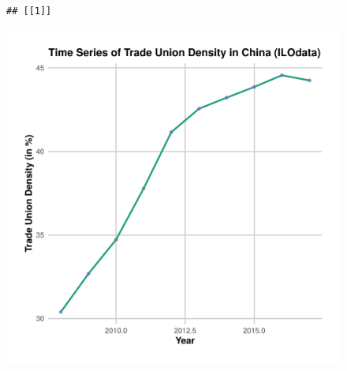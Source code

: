 \documentclass[11pt]{article}\usepackage[]{graphicx}\usepackage[]{xcolor}
\makeatletter
\newenvironment{kframe}{%
 \def\at@end@of@kframe{}%
 \ifinner\ifhmode%
  \def\at@end@of@kframe{\end{minipage}}%
  \begin{minipage}{\columnwidth}%
 \fi\fi%
 \def\FrameCommand##1{\hskip\@totalleftmargin \hskip-\fboxsep
 \colorbox{shadecolor}{##1}\hskip-\fboxsep
     \hskip-\linewidth \hskip-\@totalleftmargin \hskip\columnwidth}%
 \MakeFramed {\advance\hsize-\width
   \@totalleftmargin\z@ \linewidth\hsize
   \@setminipage}}%
 {\par\unskip\endMakeFramed%
 \at@end@of@kframe}
\newenvironment{knitrout}{}{} %
\makeatother
\begin{document}
\begin{figure}[h]
\centering
  \begin{minipage}{0.7\linewidth}
\begin{knitrout}
\color{fgcolor}\begin{kframe}
\begin{verbatim}
## [[1]]
\end{verbatim}
\end{kframe}

{\centering \includegraphics[width=0.7\linewidth]{figure/Chinatradeuniondensity-1} 

}



\end{knitrout}
  \caption{}
  \label{fig:2.3}
  \end{minipage}
\end{figure}
\end{document}
